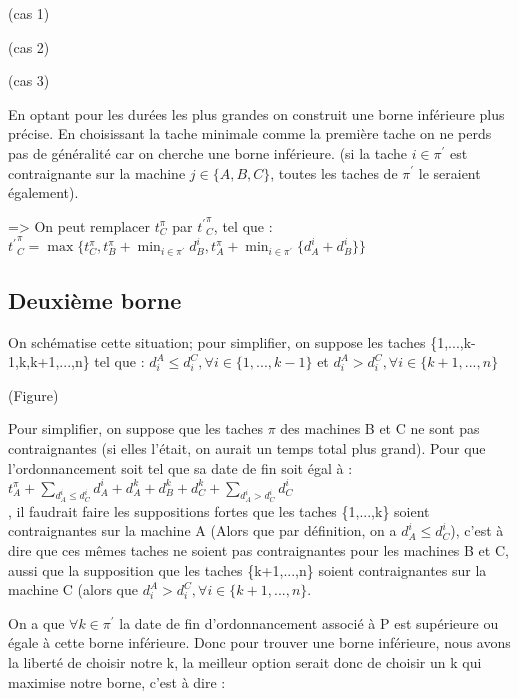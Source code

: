 \documentclass[12pt]{article}
\begin{document}
(cas 1)

(cas 2)

(cas 3)

En optant pour les durées les plus grandes on construit une borne inférieure plus précise. En choisissant la tache minimale comme la première tache on ne perds pas de généralité car on cherche une borne inférieure. (si la tache $i\in\pi^\prime$ est contraignante sur la machine $j\in\{A,B,C\}$, toutes les taches de $\pi^\prime$ le seraient également).

=> On peut remplacer $t_C^\pi$ par ${t^\prime}_C^\pi$, tel que :\\

${t^\prime}_C^\pi = \max\{t_C^\pi,t_B^\pi + \displaystyle\min_{i \in \pi^\prime} d_B^i, t_A^\pi + \displaystyle\min_{i \in \pi^\prime}\{d_A^i + d_B^i\}\}$


\subsection{Deuxième borne}

On schématise cette situation; pour simplifier, on suppose les taches \{1,...,k-1,k,k+1,...,n\} tel que : $d_i^A \le d_i^C, \forall i \in \{1,...,k-1\}$ et $d_i^A > d_i^C, \forall i \in \{k+1,...,n\}$

(Figure)

Pour simplifier, on suppose que les taches $\pi$ des machines B et C ne sont pas contraignantes (si elles l'était, on aurait un temps total plus grand). Pour que l'ordonnancement soit tel que sa date de fin soit égal à :\\

$t_A^\pi + \displaystyle\sum_{d_A^i \le d_C^i}d_A^i + d_A^k + d_B^k + d_C^k + \displaystyle\sum_{d_A^i > d_C^i}d_C^i$\\

, il faudrait faire les suppositions fortes que les taches \{1,...,k\} soient contraignantes sur la machine A (Alors que par définition, on a $d_A^i \le d_C^i$), c'est à dire que ces mêmes taches ne soient pas contraignantes pour les machines B et C, aussi que la supposition que les taches \{k+1,...,n\} soient contraignantes sur la machine C (alors que $d_i^A > d_i^C, \forall i \in \{k+1,...,n\}$.

On a que $\forall k \in \pi^\prime$ la date de fin d'ordonnancement associé à P est supérieure ou égale à cette borne inférieure. Donc pour trouver une borne inférieure, nous avons la liberté de choisir notre k, la meilleur option serait donc de choisir un k qui maximise notre borne, c'est à dire :\\
\end{document}
